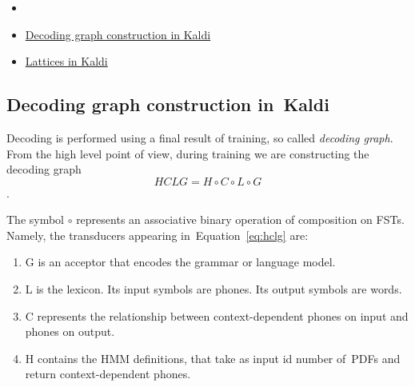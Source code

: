 

\subsubsection*{} %

\begin{itemize}
    \item {}
    \item \href{http://kaldi.sourceforge.net/graph.html} {Decoding graph construction in Kaldi}
    \item \href{http://kaldi.sourceforge.net/lattices.html} {Lattices in Kaldi}
\end{itemize}

\subsection{Decoding graph construction in~Kaldi} %

Decoding is performed using a final result of training, so called {\it decoding graph}. 
From the high level point of view,
during training we are constructing the decoding graph 
\begin{equation} \label{eq:hclg}
HCLG = H\circ C\circ L\circ G
\end{equation}.

The symbol $\circ$ represents an associative binary operation of composition on \acp{FST}.
Namely, the transducers appearing in~Equation~\ref{eq:hclg} are:
\begin{enumerate}
    \item G is an acceptor that encodes the grammar or language model.
    \item L is the lexicon. Its input symbols are phones. Its output symbols are words.
    \item C represents the relationship between context-dependent phones on input and phones on output.
    \item H contains the \ac{HMM} definitions, that take as input id number of~\acp{PDF} and return context-dependent phones.
\end{enumerate}


